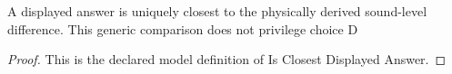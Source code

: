 \begin{definition}
  \label{def:physics:phyx-mini-0317:phyxminiproblems-problemphyxmini0317-isclosestdisplayedanswer}
  A displayed answer is uniquely closest to the physically derived sound-level difference. This generic comparison does not privilege choice D
\end{definition}
\begin{proof}
  This is the declared model definition of Is Closest Displayed Answer.
\end{proof}
